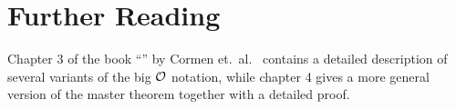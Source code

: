 \section{Further Reading}
Chapter 3 of the book ``'' by Cormen et.~al.~\cite{cormen:09}
contains a detailed description of several variants of the big $\mathcal{O}$ notation, while
chapter 4 gives a more general version of the master theorem together with a detailed proof.

